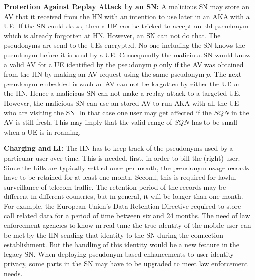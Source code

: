 \documentclass{llncs} %
\begin{document}
\textbf{Protection Against Replay Attack by an SN:} A malicious SN may store an AV that it received from the HN with an intention to use later in an AKA with a UE. If the SN could do so, then a UE can be tricked to accept an old pseudonym which is already forgotten at HN. However, an SN can not do that. The pseudonyms are send to the UEs encrypted. No one including the SN knows the pseudonym before it is used by a UE. Consequently the malicious SN would know a valid AV for a UE identified by the pseudonym $p$ only if the AV was obtained from the HN by making an AV request using the same pseudonym $p$. The next pseudonym embedded in such an AV can not be forgotten by either the UE or the HN. Hence a malicious SN can not make a replay attack to a targeted UE. However, the malicious SN can use an stored AV to run AKA with all the UE who are visiting the SN. In that case one user may get affected if the $SQN$ in the AV is still fresh. This may imply that the valid range of $SQN$ has to be small when a UE is in roaming.



\textbf{Charging and LI:} The HN has to keep track of the pseudonyms used by a particular user over time. This is needed, first, in order to bill the (right) user. Since the bills are typically settled once per month, the pseudonym usage records have to be retained for at least one month. Second, this is required for lawful surveillance of telecom traffic. The retention period of the records may be different in different countries, but in general, it will be longer than one month. For example, the European Union's Data Retention Directive \cite{dataretention} required to store call related data for a period of time between six and 24 months. The need of law enforcement agencies to know in real time the true identity of the mobile user can be met by the HN sending that identity to the SN during the connection establishment. But the handling of this identity would be a new feature in the legacy SN. When deploying pseudonym-based enhancements to user identity privacy, some parts in the SN may have to be upgraded to meet law enforcement needs.
\end{document}
